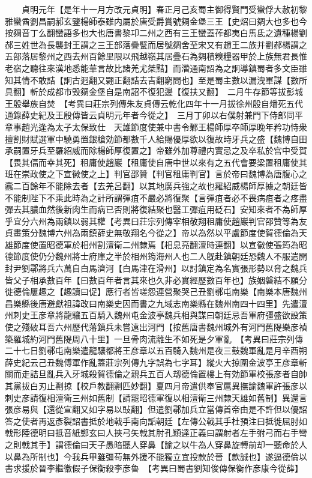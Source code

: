 　　貞明元年【是年十一月方改元貞明】春正月己亥蜀主御得賢門受蠻俘大赦初黎雅蠻酋劉昌嗣郝玄鑒楊師泰雖内屬於唐受爵賞號㚋金堡三王【史炤曰㚋大也多也今按㚋音丁么翻蠻語多也大也唐書黎卭二州之西有三王蠻蓋莋都夷白馬氐之遺種楊劉郝三姓世為長襲封王謂之三王部落疊甓而居號㚋舍至宋又有趙王二族并劉郝楊謂之五部落居黎州之西去州百餘里限以飛越嶺其居疊石為㚋積糗糧器甲於上族無君長惟老宿之聽往來漢地悉能華言故比諸羌尤桀黠】而濳通南詔為之詗導鎮蜀者多文臣雖知其情不敢詰【詗古迥翻又翾正翻詰去吉翻窮問也】至是蜀主數以漏洩軍謀【數所具翻】斬於成都市毁㚋金堡自是南詔不復犯邊【復扶又翻】　二月牛存節等拔彭城王殷舉族自焚　【考異曰莊宗列傳朱友貞傳云乾化四年十一月拔徐州殷自燔死五代通錄薛史紀及王殷傳皆云貞明元年者今從之】　三月丁卯以右僕射兼門下侍郎同平章事趙光逢為太子太保致仕　天雄節度使兼中書令鄴王楊師厚卒師厚晚年矜功恃衆擅割財賦選軍中驍勇置銀槍効節都數千人給賜優厚欲以復故時牙兵之盛【魏博自田承嗣置牙兵至羅紹威而除楊師厚復置之】帝雖外加尊禮内實忌之及卒私於宫中受賀【畏其偪而幸其死】租庸使趙巖【租庸使自唐中世以來有之五代會要梁置租庸使其班在崇政使之下宣徽使之上】判官邵贊【判官租庸判官】言於帝曰魏博為唐腹心之蠧二百餘年不能除去者【去羌呂翻】以其地廣兵強之故也羅紹威楊師厚據之朝廷皆不能制陛下不乘此時為之計所謂彈疽不嚴必將復聚【言彈疽者必不畏病疽者之疼盡彈去其膿血然後新肉生而病已否則將復結聚也醫工彈疽用砭石】安知來者不為師厚乎宜分六州為兩鎮以弱其權【考異曰莊宗列傳宰相敬翔租庸使趙巖判官邵贊等為友貞畫策分魏博六州為兩鎮薛史無敬翔名今從之】帝以為然以平盧節度使賀德倫為天雄節度使置昭德軍於相州割澶衛二州隸焉【相息亮翻澶時連翻】以宣徽使張筠為昭德節度使仍分魏州將士府庫之半於相州筠海州人也二人旣赴鎮朝廷恐魏人不服遣開封尹劉鄩將兵六萬自白馬濟河【白馬津在滑州】以討鎮定為名實張形勢以脅之魏兵皆父子相承數百年【曰數百年者言其來也久非必實經歷數百年也】族姻磐結不願分徙德倫屢趣之【趣讀曰促】應行者皆嗟怨連營聚哭己丑劉鄩屯南樂【南樂本唐魏州昌樂縣後唐避獻祖諱改曰南樂史因而書之九域志南樂縣在魏州南四十四里】先遣澶州刺史王彦章將龍驤五百騎入魏州屯金波亭魏兵相與謀曰朝廷忌吾軍府彊盛欲設策使之殘破耳吾六州歷代藩鎮兵未嘗遠出河門【按舊唐書魏州城外有河門舊隄樂彦禎築羅城約河門舊隄周八十里】一旦骨肉流離生不如死是夕軍亂　【考異曰莊宗列傳二十七日劉鄩屯南樂遣龍驤都將王彦章以五百騎入魏州是夜三鼓魏軍亂是月辛酉朔薛史紀云己丑魏傅軍作亂蓋莊宗列傳九字誤為七字耳】縱火大掠圍金波亭王彦章斬關而走詰旦亂兵入牙城殺賀德倫之親兵五百人刼德倫置樓上有効節軍校張彦者自帥其黨拔白刃止剽掠【校戶教翻剽匹妙翻】夏四月帝遣供奉官扈異撫諭魏軍許張彦以刺史彦請復相澶衛三州如舊制【請罷昭德軍復以相澶衛三州隸天雄如舊制】異還言張彦易與【還從宣翻又如字易以䜴翻】但遣劉鄩加兵立當傳首帝由是不許但以優詔答之使者再返彥裂詔書抵於地戟手南向詬朝廷【左傳公戟其手杜預注曰抵徙屈肘如戟形陸德明曰抵音紙鄭玄曰人挾弓矢戟其肘孔穎達正義曰謂射者左手弣弓而右手彎之則戟其手】謂德倫曰天子愚暗聽人穿鼻【諭之以牛為人穿鼻旋轉前却一聽命於人以鼻為所制也】今我兵甲雖彊苟無外援不能獨立宜投款於晉【款誠也】遂逼德倫以書求援於晉李繼徽假子保衡殺李彦魯　【考異曰蜀書劉知俊傳保衡作彦康今從薛】

